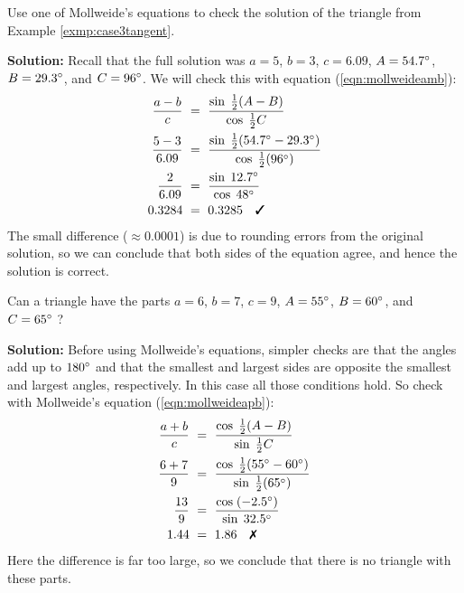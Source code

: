 \begin{exmp}
 Use one of Mollweide's equations to check the solution of the triangle from Example
 \ref{exmp:case3tangent}.\vspace{1mm}
 \par\noindent\textbf{Solution:} Recall that the full solution was $a=5$, $b=3$, $c=6.09$,
 $A=54.7^\circ$, $B=29.3^\circ$, and $C=96^\circ$. We will check this with equation
 (\ref{eqn:mollweideamb}):
 \begin{align*}
 \frac{a-b}{c} ~&=~ \frac{\sin\;\frac{1}{2}(A-B)}{\cos\;\frac{1}{2}C}\\
 \frac{5-3}{6.09} ~&=~
  \frac{\sin\;\frac{1}{2}(54.7\Degrees - 29.3\Degrees)}{\cos\;\frac{1}{2}(96\Degrees)}\\
  \frac{2}{6.09} ~&=~ \frac{\sin\;12.7\Degrees}{\cos\;48\Degrees}\\
  0.3284 ~&=~ 0.3285 \quad\text{\ding{51}}
 \end{align*}
 The small difference ($\approx 0.0001$) is due to rounding errors from the
 original solution, so we can conclude that both sides of the equation agree, and hence the
 solution is correct.
\end{exmp}\vspace{-2mm}
\divider
\newpage
\begin{exmp}
 Can a triangle have the parts $a=6$, $b=7$, $c=9$, $A=55^\circ$,
 $B=60^\circ$, and $C=65^\circ\;$?\vspace{1mm}
 \par\noindent\textbf{Solution:} Before using Mollweide's equations, simpler checks are that the
 angles add up to $180^\circ$ and that the smallest and largest sides are opposite the smallest
 and largest angles, respectively. In this case all those conditions hold. So check with
 Mollweide's equation (\ref{eqn:mollweideapb}):
 \begin{align*}
 \frac{a+b}{c} ~&=~ \frac{\cos\;\frac{1}{2}(A-B)}{\sin\;\frac{1}{2}C}\\
 \frac{6+7}{9} ~&=~
  \frac{\cos\;\frac{1}{2}(55\Degrees - 60\Degrees)}{\sin\;\frac{1}{2}(65\Degrees)}\\
  \frac{13}{9} ~&=~ \frac{\cos\;(-2.5\Degrees)}{\sin\;32.5\Degrees}\\
  1.44 ~&=~ 1.86 \quad\text{\ding{55}}
 \end{align*}
 Here the difference is far too large, so we conclude that there is no triangle with these parts.
\end{exmp}\vspace{-2mm}
\divider
\vspace{1mm}


